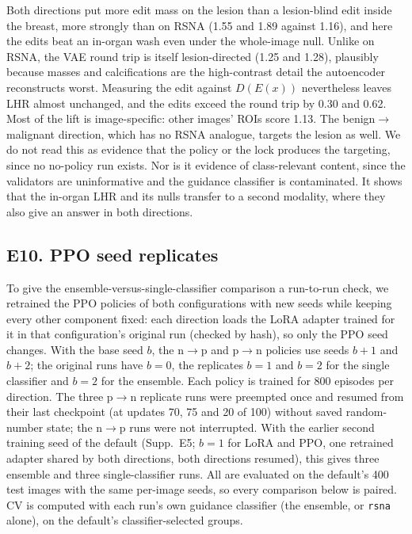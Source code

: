 Both directions put more edit mass on the lesion than a lesion-blind edit inside the breast, more strongly than on RSNA (1.55 and 1.89 against 1.16), and here the edits beat an in-organ wash even under the whole-image null. Unlike on RSNA, the VAE round trip is itself lesion-directed (1.25 and 1.28), plausibly because masses and calcifications are the high-contrast detail the autoencoder reconstructs worst. Measuring the edit against $D(E(x))$ nevertheless leaves LHR almost unchanged, and the edits exceed the round trip by 0.30 and 0.62. Most of the lift is image-specific: other images' ROIs score 1.13. The benign$\to$malignant direction, which has no RSNA analogue, targets the lesion as well. We do not read this as evidence that the policy or the lock produces the targeting, since no no-policy run exists. Nor is it evidence of class-relevant content, since the validators are uninformative and the guidance classifier is contaminated. It shows that the in-organ LHR and its nulls transfer to a second modality, where they also give an answer in both directions.

\subsection*{E10. PPO seed replicates}
\label{sec:suppl-seeds}

To give the ensemble-versus-single-classifier comparison a run-to-run check, we retrained the PPO policies of both configurations with new seeds while keeping every other component fixed: each direction loads the LoRA adapter trained for it in that configuration's original run (checked by hash), so only the PPO seed changes. With the base seed $b$, the n$\to$p and p$\to$n policies use seeds $b+1$ and $b+2$; the original runs have $b=0$, the replicates $b=1$ and $b=2$ for the single classifier and $b=2$ for the ensemble. Each policy is trained for 800 episodes per direction. The three p$\to$n replicate runs were preempted once and resumed from their last checkpoint (at updates 70, 75 and 20 of 100) without saved random-number state; the n$\to$p runs were not interrupted. With the earlier second training seed of the default (Supp.~E5; $b=1$ for LoRA and PPO, one retrained adapter shared by both directions, both directions resumed), this gives three ensemble and three single-classifier runs. All are evaluated on the default's 400 test images with the same per-image seeds, so every comparison below is paired. CV is computed with each run's own guidance classifier (the ensemble, or \texttt{rsna} alone), on the default's classifier-selected groups.

